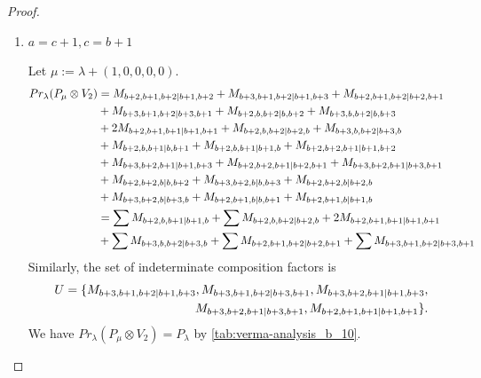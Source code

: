 \begin{proof}
\begin{enumerate}
\begin{enumerate}
      \item $a=c+1,c=b+1$\par
        Let $\mu:=\lambda + (1,0,0,0,0) $.
        \begin{equation}\notag
          \begin{aligned}
            Pr_{\lambda}(P_\mu \otimes V_{2}) &=
M_{b+2,b+1,b+2|b+1,b+2}
+ M_{b+3,b+1,b+2|b+1,b+3}
+ M_{b+2,b+1,b+2|b+2,b+1}\\
                                              &
+ M_{b+3,b+1,b+2|b+3,b+1}
+ M_{b+2,b,b+2|b,b+2}
+ M_{b+3,b,b+2|b,b+3}\\
                                              &
+ 2M_{b+2,b+1,b+1|b+1,b+1}
+ M_{b+2,b,b+2|b+2,b}
+ M_{b+3,b,b+2|b+3,b}\\
                                              &
+ M_{b+2,b,b+1|b,b+1}
+ M_{b+2,b,b+1|b+1,b}
+ M_{b+2,b+2,b+1|b+1,b+2}\\
                                              &
+ M_{b+3,b+2,b+1|b+1,b+3}
+ M_{b+2,b+2,b+1|b+2,b+1}
+ M_{b+3,b+2,b+1|b+3,b+1}\\
                                              &
+ M_{b+2,b+2,b|b,b+2}
+ M_{b+3,b+2,b|b,b+3}
+ M_{b+2,b+2,b|b+2,b}\\
                                              &
+ M_{b+3,b+2,b|b+3,b}
+ M_{b+2,b+1,b|b,b+1}
+ M_{b+2,b+1,b|b+1,b} \\
                                               &=
\sum M_{b+2,b,b+1|b+1,b}
+ \sum M_{b+2,b,b+2|b+2,b}
+ 2 M_{b+2,b+1,b+1|b+1,b+1}\\
                                              &
+ \sum M_{b+3,b,b+2|b+3,b}
+ \sum M_{b+2,b+1,b+2|b+2,b+1}
+ \sum M_{b+3,b+1,b+2|b+3,b+1}
          \end{aligned}
        \end{equation}
      Similarly, the set of indeterminate composition factors is 
\begin{equation}\notag
  \begin{aligned}
    U = \{
M_{b+3,b+1,b+2|b+1,b+3},
M_{b+3,b+1,b+2|b+3,b+1},
M_{b+3,b+2,b+1|b+1,b+3},\\
M_{b+3,b+2,b+1|b+3,b+1},
M_{b+2,b+1,b+1|b+1,b+1}
\}.
  \end{aligned}
\end{equation}
       We have $Pr_{\lambda}(P_\mu \otimes V_{2}) = P_\lambda  $ by \cref{tab:verma-analysis_b_10}.
\begin{table}[htbp]
\centering
\caption{Calculation of Verma modules in $\operatorname{Filt}(P_*) \setminus \operatorname{Filt}(\prl(P_\lambda \otimes V_{2})) $ } \label{tab:verma-analysis_b_10}

\end{table}
\end{enumerate}
\end{enumerate}
\end{proof}
